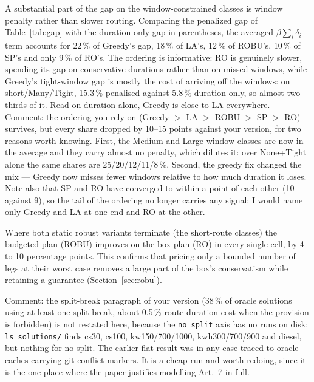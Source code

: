 \documentclass[preprint,12pt,3p]{elsarticle}
\newcommand{\green}[1]{{\color{darkgreen}#1}}
\newcommand{\blue}[1]{{\color{darkblue}#1}}
\begin{document}
A substantial part of the gap on the window-constrained classes is window penalty rather than slower routing. Comparing the penalized gap of Table~\ref{tab:gap} with the duration-only gap in parentheses, the averaged $\beta\sum_i\delta_i$ term accounts for \blue{22\,\%} of Greedy's gap, \blue{18\,\%} of LA's, \blue{12\,\%} of ROBU's, \blue{10\,\%} of SP's and only \blue{9\,\%} of RO's. The ordering is informative: RO is genuinely slower, spending its gap on conservative durations rather than on missed windows, while Greedy's tight-window gap is mostly the cost of arriving off the windows: on short/Many/Tight, \blue{15.3\,\%} penalised against 5.8\,\% duration-only, so almost two thirds of it. Read on duration alone, Greedy is close to LA everywhere.
\green{Comment: the ordering you rely on (Greedy $>$ LA $>$ ROBU $>$ SP $>$ RO) survives,
but every share dropped by 10--15 points against your version, for two reasons worth
knowing. First, the Medium and Large window classes are now in the average and they
carry almost no penalty, which dilutes it: over None+Tight alone the same shares are
25/20/12/11/8\,\%. Second, the greedy fix changed the mix --- Greedy now misses
fewer windows relative to how much duration it loses. Note also that SP and RO have
converged to within a point of each other (10 against 9), so the tail of the
ordering no longer carries any signal; I would name only Greedy and LA at one end
and RO at the other.}

Where both static robust variants terminate (the short-route classes) the budgeted plan (ROBU) improves on the box plan (RO) in every single cell, by 4 to 10 percentage points. This confirms that pricing only a bounded number of legs at their worst case removes a large part of the box's conservatism while retaining a guarantee (Section~\ref{sec:robu}).

\green{Comment: the split-break paragraph of your version (38\,\% of oracle solutions
using at least one split break, about 0.5\,\% route-duration cost when the provision
is forbidden) is not restated here, because the \texttt{no\_split} axis has no runs
on disk: \texttt{ls solutions/} finds cs30, cs100, kw150/700/1000, kwh300/700/900 and
diesel, but nothing for no-split. The earlier flat result was in any case traced to
oracle caches carrying git conflict markers. It is a cheap run and worth redoing,
since it is the one place where the paper justifies modelling Art.~7 in full.}
\end{document}
